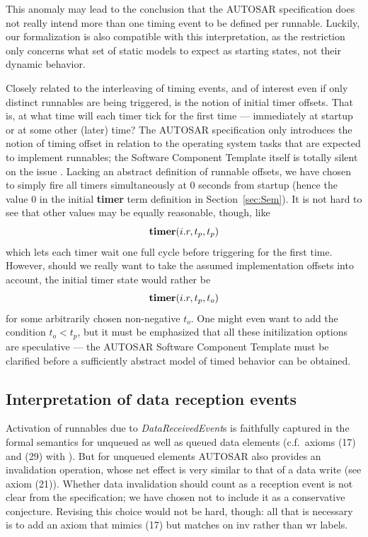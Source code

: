 \documentclass[twocolumn]{article}
\begin{document}
This anomaly may lead to the conclusion that the AUTOSAR specification does not really intend more than one timing event to be defined per runnable. Luckily, our formalization is also compatible with this interpretation, as the restriction only concerns what set of static models to expect as starting states, not their dynamic behavior.

Closely related to the interleaving of timing events, and of interest even if only distinct runnables are being triggered, is the notion of initial timer offsets. That is, at what time will each timer tick for the first time --- immediately at startup or at some other (later) time? The AUTOSAR specification only introduces the notion of timing offset in relation to the operating system tasks that are expected to implement runnables; the Software Component Template itself is totally silent on the issue \cite{AR:SWC}. Lacking an abstract definition of runnable offsets, we have chosen to simply fire all timers simultaneously at $0$ seconds from startup (hence the value $0$ in the initial {\bf timer} term definition in Section~\ref{sec:Sem}). It is not hard to see that other values may be equally reasonable, though, like
$$
	\textbf{timer}(i.r,t_p,t_p)
$$
which lets each timer wait one full cycle before triggering for the first time. However, should we really want to take the assumed implementation offsets into account, the initial timer state would rather be
$$
	\textbf{timer}(i.r,t_p,t_o)
$$
for some arbitrarily chosen non-negative $t_o$. One might even want to add the condition $t_o < t_p$, but it must be emphasized that all these initilization options are speculative --- the AUTOSAR Software Component Template must be clarified before a sufficiently abstract model of timed behavior can be obtained.


\subsection{Interpretation of data reception events}

Activation of runnables due to \emph{DataReceivedEvent}s is faithfully captured in the formal semantics for unqueued as well as queued data elements (c.f.~axioms (17) and (29) with \cite[ch.~7.5.1.6]{AR:SWC}). But for unqueued elements AUTOSAR also provides an invalidation operation, whose net effect is very similar to that of a data write (see axiom (21)). Whether data invalidation should count as a reception event is not clear from the specification; we have chosen not to include it as a conservative conjecture. Revising this choice would not be hard, though: all that is necessary is to add an axiom that mimics (17) but matches on {\sc inv} rather than {\sc wr} labels.
\end{document}
